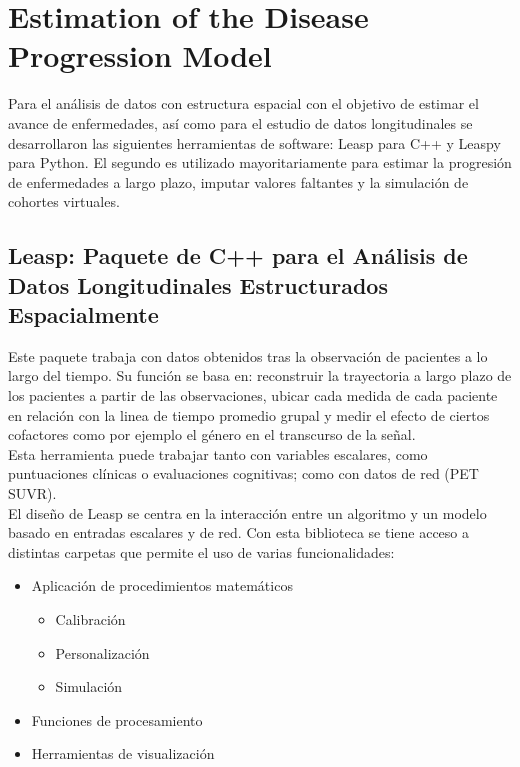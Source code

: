 \documentclass[12pt]{article}
\begin{document}
\section{Estimation of the Disease Progression Model}

Para el análisis de datos con estructura espacial con el objetivo de estimar el
avance de enfermedades, así como para el estudio de datos longitudinales se
desarrollaron las siguientes herramientas de software: Leasp para C++ y Leaspy
para Python. El segundo es utilizado mayoritariamente para estimar la progresión
de enfermedades a largo plazo, imputar valores faltantes y la simulación de
cohortes virtuales.

\subsection{Leasp: Paquete de C++ para el Análisis de Datos Longitudinales
	Estructurados Espacialmente}

Este paquete trabaja con datos obtenidos tras la observación de pacientes a lo
largo del tiempo. Su función se basa en: reconstruir la trayectoria a largo
plazo de los pacientes a partir de las observaciones, ubicar cada medida de cada
paciente en relación con la linea de tiempo promedio grupal y medir el efecto de
ciertos cofactores como por ejemplo el género en el transcurso de la señal.\\

Esta herramienta puede trabajar tanto con variables escalares, como puntuaciones
clínicas o evaluaciones cognitivas; como con 	datos de red (PET SUVR).\\

El diseño de Leasp se centra en la interacción entre un algoritmo y un modelo
basado en entradas escalares y de red. Con esta biblioteca se tiene acceso a
distintas carpetas que permite el uso de varias funcionalidades:
\begin{itemize}
	\item Aplicación de procedimientos matemáticos
	\begin{itemize}
		\item Calibración
		\item Personalización
		\item Simulación
	\end{itemize}
	\item Funciones de procesamiento
	\item Herramientas de visualización
\end{itemize}
\end{document}
